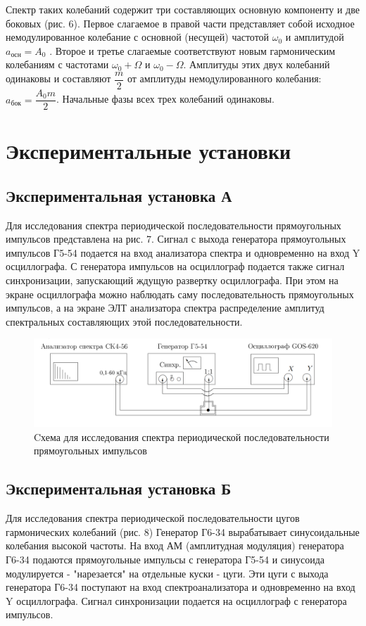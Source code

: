 		Спектр таких колебаний содержит три составляющих  основную
		компоненту и две боковых (рис. 6). Первое слагаемое в правой части представляет собой исходное немодулированное колебание
		с основной (несущей) частотой $\omega_{0}$ и амплитудой $a_{осн} = A_{0}$ . Второе и третье слагаемые соответствуют новым гармоническим колебаниям с частотами $\omega_{0} + \Omega$ и $\omega_{0} - \Omega$. Амплитуды этих двух колебаний одинаковы и составляют $\dfrac{m}{2}$ от амплитуды немодулированного колебания:
		$a_{бок} = \dfrac{A_{0}m}{2}$. Начальные фазы всех трех колебаний одинаковы.


	\section{Экспериментальные установки}
	
		
		\subsection{Экспериментальная установка А} 
		Для исследования спектра периодической последовательности прямоугольных импульсов представлена на рис. 7. Сигнал с выхода генератора прямоугольных импульсов Г5-54 подается на
		вход анализатора спектра и одновременно  на вход Y осциллографа. С генератора импульсов на осциллограф подается также сигнал синхронизации, запускающий ждущую развертку осциллографа. При этом на экране осциллографа можно наблюдать саму последовательность прямоугольных импульсов, а на экране ЭЛТ анализатора спектра  распределение амплитуд спектральных составляющих этой последовательности.
		
					
		\begin{figure}[h!]
			\centering
			\includegraphics[width=0.8\linewidth]{pics/sp7.png}
			\caption{Cхема для исследования спектра периодической последовательности прямоугольных импульсов}
			\label{A}
		\end{figure}
			
\subsection{Экспериментальная установка Б} 
Для исследования спектра периодической последовательности цугов гармонических колебаний (рис. 8) Генератор Г6-34 вырабатывает синусоидальные колебания высокой частоты. На вход АМ (амплитудная модуляция) генератора Г6-34 подаются прямоугольные импульсы с генератора Г5-54 и синусоида модулируется - "нарезается" на отдельные куски - цуги. Эти цуги с выхода генератора Г6-34 поступают на вход спектроанализатора и одновременно на вход Y осциллографа. Сигнал синхронизации подается на осциллограф с генератора импульсов.
		
